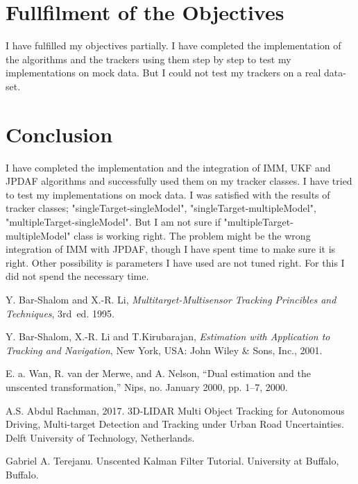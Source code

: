 \documentclass[peerreview]{IEEEtran}
\begin{document}
\label{tbl:Spended Time}





\section{Fullfilment of the Objectives}
I have fulfilled my objectives partially. I have completed the implementation of the algorithms and the trackers using them step by step to test my implementations on mock data. But I could not test my trackers on a real data-set.

\section{Conclusion}
I have completed the implementation and the integration of IMM, UKF and JPDAF algorithms and successfully used them on my tracker classes. I have tried to test my implementations on mock data. I was satisfied with the results of tracker classes; "singleTarget-singleModel", "singleTarget-multipleModel", "multipleTarget-singleModel". But I am not sure if "multipleTarget-multipleModel" class is working right. The problem might be the wrong integration of IMM with JPDAF, though I have spent time to make sure it is right. Other possibility is parameters I have used are not tuned right. For this I did not spend the necessary time.


\begin{thebibliography}{1}
Y. Bar-Shalom and X.-R. Li, \emph{Multitarget-Multisensor Tracking Princibles and Techniques}, 3rd~ed. 1995.

Y. Bar-Shalom, X.-R. Li and T.Kirubarajan, \emph{Estimation with Application to Tracking and Navigation}, New York, USA: John Wiley \& Sons, Inc., 2001.


E. a. Wan, R. van der Merwe, and A. Nelson, “Dual estimation and the unscented
transformation,” Nips, no. January 2000, pp. 1–7, 2000.

A.S. Abdul Rachman, 2017. 3D-LIDAR Multi Object Tracking for Autonomous Driving, Multi-target Detection and Tracking under Urban Road
Uncertainties. Delft University of Technology, Netherlands.

Gabriel A. Terejanu. Unscented Kalman Filter Tutorial. University at Buffalo, Buffalo.




\end{thebibliography}
\end{document}
